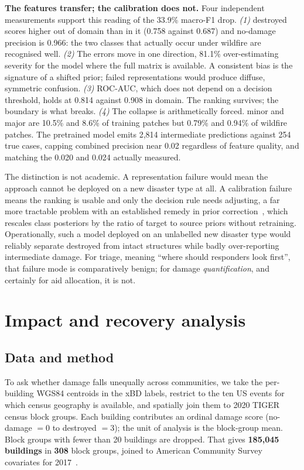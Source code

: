 \documentclass[10pt,twocolumn]{article}
\newcommand{\keybox}[2]{%
  \begin{center}
  \setlength{\fboxsep}{8pt}%
  \colorbox{#1}{\begin{minipage}{0.90\columnwidth}\small #2\end{minipage}}%
  \end{center}}
\newcommand{\class}[1]{\textsf{#1}}
\begin{document}
\keybox{accentbg}{
\textbf{The features transfer; the calibration does not.} Four independent measurements support this
reading of the 33.9\% macro-F1 drop.
\emph{(1)} \class{destroyed} scores higher out of domain than in it (0.758 against 0.687) and
\class{no-damage} precision is 0.966: the two classes that actually occur under wildfire are
recognised well.
\emph{(2)} The errors move in one direction, 81.1\% over-estimating severity for the model where the
full matrix is available. A consistent bias is the signature of a shifted prior; failed
representations would produce diffuse, symmetric confusion.
\emph{(3)} ROC-AUC, which does not depend on a decision threshold, holds at 0.814 against 0.908 in
domain. The ranking survives; the boundary is what breaks.
\emph{(4)} The collapse is arithmetically forced. \class{minor} and \class{major} are 10.5\% and
8.6\% of training patches but 0.79\% and 0.94\% of wildfire patches. The pretrained model emits 2,814
intermediate predictions against 254 true cases, capping combined precision near 0.02 regardless of
feature quality, and matching the 0.020 and 0.024 actually measured.}

The distinction is not academic. A representation failure would mean the approach cannot be deployed
on a new disaster type at all. A calibration failure means the ranking is usable and only the
decision rule needs adjusting, a far more tractable problem with an established remedy in prior
correction~\cite{saerens}, which rescales class posteriors by the ratio of target to source priors
without retraining. Operationally, such a model deployed on an unlabelled new disaster type would
reliably separate destroyed from intact structures while badly over-reporting intermediate damage.
For triage, meaning ``where should responders look first'', that failure mode is comparatively
benign; for damage \emph{quantification}, and certainly for aid allocation, it is not.

\section{Impact and recovery analysis}
\label{sec:socio}

\subsection{Data and method}

To ask whether damage falls unequally across communities, we take the per-building WGS84 centroids in
the xBD labels, restrict to the ten US events for which census geography is available, and spatially
join them to 2020 TIGER census block groups. Each building contributes an ordinal damage score
(\class{no-damage} $= 0$ to \class{destroyed} $= 3$); the unit of analysis is the block-group mean.
Block groups with fewer than 20 buildings are dropped. That gives \textbf{185,045 buildings} in
\textbf{308} block groups, joined to American Community Survey covariates for 2017~\cite{acs}.
\end{document}
